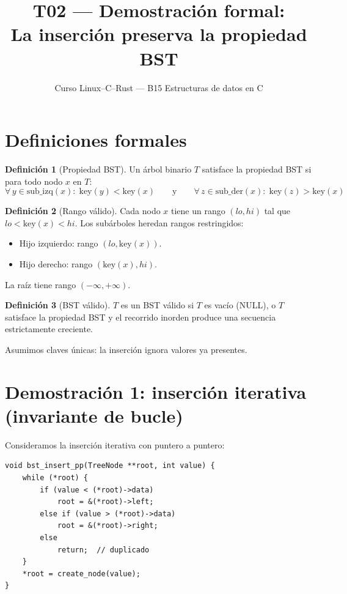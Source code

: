 \documentclass[11pt, letterpaper]{article}
\title{%
  T02 --- Demostración formal:\\[4pt]
  La inserción preserva la propiedad BST
}
\author{Curso Linux--C--Rust --- B15 Estructuras de datos en C}
\date{}
\theoremstyle{definition}
\newtheorem{definition}{Definición}[section]
\theoremstyle{plain}
\theoremstyle{remark}
\begin{document}
\maketitle
\tableofcontents

\section{Definiciones formales}

\begin{definition}[Propiedad BST]
Un árbol binario $T$ satisface la propiedad BST si para todo nodo $x$
en $T$:
\[
  \forall\, y \in \text{sub\_izq}(x):\; \text{key}(y) < \text{key}(x)
  \qquad\text{y}\qquad
  \forall\, z \in \text{sub\_der}(x):\; \text{key}(z) > \text{key}(x)
\]
\end{definition}

\begin{definition}[Rango válido]
Cada nodo $x$ tiene un rango $(lo, hi)$ tal que $lo < \text{key}(x) < hi$.
Los subárboles heredan rangos restringidos:
\begin{itemize}
  \item Hijo izquierdo: rango $(lo, \text{key}(x))$.
  \item Hijo derecho: rango $(\text{key}(x), hi)$.
\end{itemize}
La raíz tiene rango $(-\infty, +\infty)$.
\end{definition}

\begin{definition}[BST válido]
$T$ es un BST válido si $T$ es vacío (NULL), o $T$ satisface la
propiedad BST y el recorrido inorden produce una secuencia
estrictamente creciente.
\end{definition}

Asumimos claves únicas: la inserción ignora valores ya presentes.

\section{Demostración 1: inserción iterativa (invariante de bucle)}

Consideramos la inserción iterativa con puntero a puntero:

\begin{lstlisting}
void bst_insert_pp(TreeNode **root, int value) {
    while (*root) {
        if (value < (*root)->data)
            root = &(*root)->left;
        else if (value > (*root)->data)
            root = &(*root)->right;
        else
            return;  // duplicado
    }
    *root = create_node(value);
}
\end{lstlisting}
\end{document}
